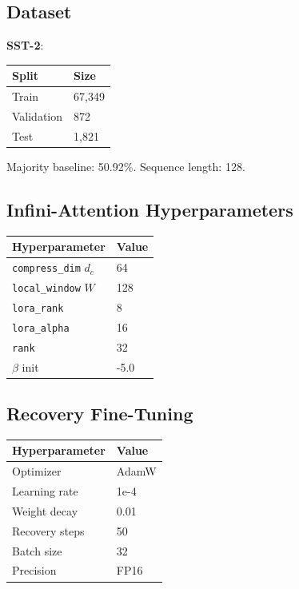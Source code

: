 \subsection{Dataset}

\textbf{SST-2}:

\begin{table}[H]
\centering
\small
\begin{tabular}{ll}
\toprule
\textbf{Split} & \textbf{Size} \\
\midrule
Train & 67,349 \\
Validation & 872 \\
Test & 1,821 \\
\bottomrule
\end{tabular}
\end{table}

Majority baseline: 50.92\%. Sequence length: 128.

\subsection{Infini-Attention Hyperparameters}

\begin{table}[H]
\centering
\small
\begin{tabular}{ll}
\toprule
\textbf{Hyperparameter} & \textbf{Value} \\
\midrule
\texttt{compress\_dim} $d_c$ & 64 \\
\texttt{local\_window} $W$ & 128 \\
\texttt{lora\_rank} & 8 \\
\texttt{lora\_alpha} & 16 \\
\texttt{rank} & 32 \\
$\beta$ init & -5.0 \\
\bottomrule
\end{tabular}
\end{table}

\subsection{Recovery Fine-Tuning}

\begin{table}[H]
\centering
\small
\begin{tabular}{ll}
\toprule
\textbf{Hyperparameter} & \textbf{Value} \\
\midrule
Optimizer & AdamW \\
Learning rate & 1e-4 \\
Weight decay & 0.01 \\
Recovery steps & 50 \\
Batch size & 32 \\
Precision & FP16 \\
\bottomrule
\end{tabular}
\end{table}

